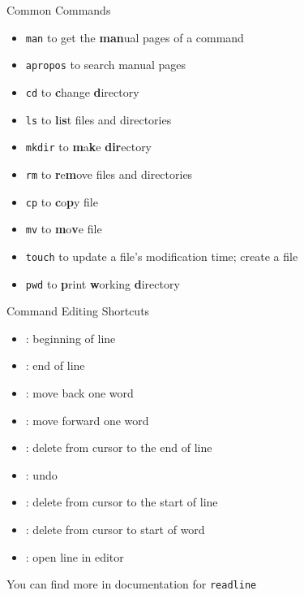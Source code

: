 \documentclass[12pt]{beamer}
\begin{document}
\begin{frame}{Common Commands}
  \begin{itemize}
    \item \texttt{man} to get the \textbf{man}ual pages of a command
    \item \texttt{apropos} to search manual pages
    \item \texttt{cd} to \textbf{c}hange \textbf{d}irectory
    \item \texttt{ls} to \textbf{l}i\textbf{s}t files and directories
    \item \texttt{mkdir} to \textbf{m}a\textbf{k}e \textbf{dir}ectory
    \item \texttt{rm} to \textbf{r}e\textbf{m}ove files and directories
    \item \texttt{cp} to \textbf{c}o\textbf{p}y file
    \item \texttt{mv} to \textbf{m}o\textbf{v}e file
    \item \texttt{touch} to update a file's modification time; create a file
    \item \texttt{pwd} to \textbf{p}rint \textbf{w}orking \textbf{d}irectory
  \end{itemize}
\end{frame}

\begin{frame}{Command Editing Shortcuts}
  \begin{itemize}
    \item {}: beginning of line
    \item {}: end of line
    \item {}: move back one word
    \item {}: move forward one word
    \item {}: delete from cursor to the end of line
    \item \keys{\ctrlwin + \_}: undo
    \item {}: delete from cursor to the start of line
    \item {}: delete from cursor to start of word
    \item {}: open line in editor
  \end{itemize}

  You can find more in documentation for \texttt{readline}
\end{frame}
\end{document}

